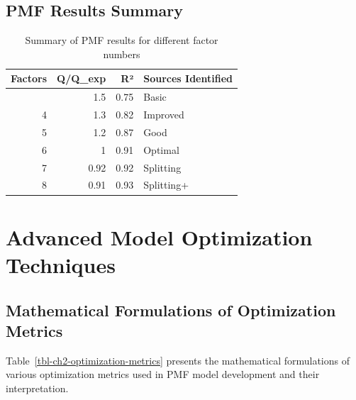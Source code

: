 \documentclass[
  letterpaper,
  oneside,
  openany]{MastersDoctoralThesis}
\begin{document}
\subsection{PMF Results Summary}\label{pmf-results-summary}

\begin{longtable}[]{@{}rrrl@{}}

\caption{\label{tbl-pmf-summary}Summary of PMF results for different
factor numbers}

\tabularnewline

\toprule\noalign{}
Factors & Q/Q\_exp & R² & Sources Identified \\
\midrule\noalign{}
\endhead
\bottomrule\noalign{}
\endlastfoot
3 & 1.5 & 0.75 & Basic \\
4 & 1.3 & 0.82 & Improved \\
5 & 1.2 & 0.87 & Good \\
6 & 1 & 0.91 & Optimal \\
7 & 0.92 & 0.92 & Splitting \\
8 & 0.91 & 0.93 & Splitting+ \\

\end{longtable}

\section{Advanced Model Optimization Techniques}\label{sec-ch2-advanced}

\subsection{Mathematical Formulations of Optimization
Metrics}\label{sec-ch2-math}

Table~\ref{tbl-ch2-optimization-metrics} presents the mathematical
formulations of various optimization metrics used in PMF model
development and their interpretation.
\end{document}
